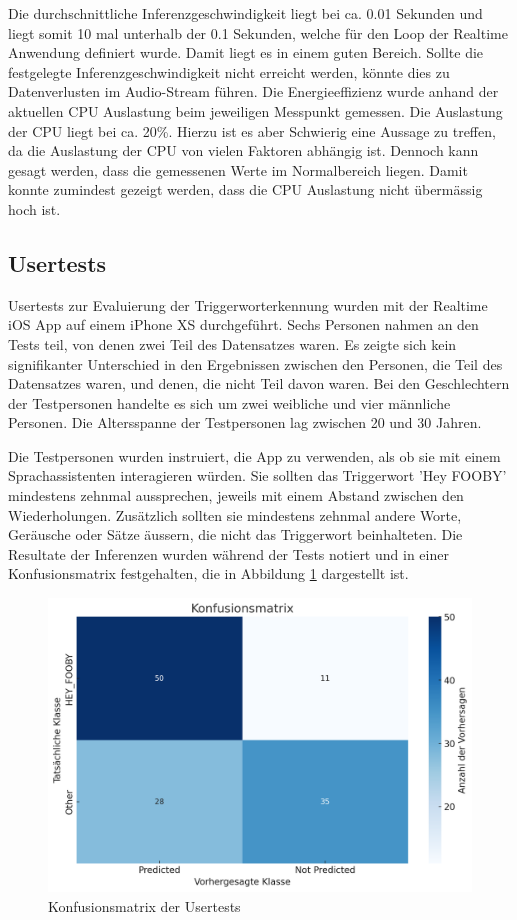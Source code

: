 \documentclass[11pt,a4paper]{article}
\begin{document}
\noindent \newline
Die durchschnittliche Inferenzgeschwindigkeit liegt bei ca. 0.01 Sekunden und liegt somit 10 mal
unterhalb der 0.1 Sekunden, welche für den Loop der Realtime Anwendung definiert wurde. Damit liegt 
es in einem guten Bereich. Sollte die festgelegte Inferenzgeschwindigkeit nicht erreicht werden, 
könnte dies zu Datenverlusten im Audio-Stream führen. Die Energieeffizienz wurde anhand der 
aktuellen CPU Auslastung beim jeweiligen Messpunkt gemessen. Die Auslastung der CPU liegt bei ca. 
20\%. Hierzu ist es aber Schwierig eine Aussage zu treffen, da die Auslastung der CPU von vielen 
Faktoren abhängig ist. Dennoch kann gesagt werden, dass die gemessenen Werte im Normalbereich 
liegen. Damit konnte zumindest gezeigt werden, dass die CPU Auslastung nicht übermässig hoch ist. 

\subsection{Usertests}
Usertests zur Evaluierung der Triggerworterkennung wurden mit der Realtime iOS App auf einem iPhone 
XS durchgeführt. Sechs Personen nahmen an den Tests teil, von denen zwei Teil des Datensatzes waren. 
Es zeigte sich kein signifikanter Unterschied in den Ergebnissen zwischen den Personen, die Teil des 
Datensatzes waren, und denen, die nicht Teil davon waren. Bei den Geschlechtern der Testpersonen 
handelte es sich um zwei weibliche und vier männliche Personen. Die Altersspanne der Testpersonen 
lag zwischen 20 und 30 Jahren.

\noindent \newline
Die Testpersonen wurden instruiert, die App zu verwenden, als ob sie mit einem Sprachassistenten 
interagieren würden. Sie sollten das Triggerwort 'Hey FOOBY' mindestens zehnmal aussprechen, 
jeweils mit einem Abstand zwischen den Wiederholungen. Zusätzlich sollten sie mindestens zehnmal 
andere Worte, Geräusche oder Sätze äussern, die nicht das Triggerwort beinhalteten. Die Resultate 
der Inferenzen wurden während der Tests notiert und in einer Konfusionsmatrix festgehalten, die in 
Abbildung \ref{fig:usertests} dargestellt ist.

\begin{figure}[H]
	\centering
	\includegraphics[width=0.8\linewidth]{img/eval-usertests.png}
	\caption{Konfusionsmatrix der Usertests}
	\label{fig:usertests}
\end{figure}
\end{document}
